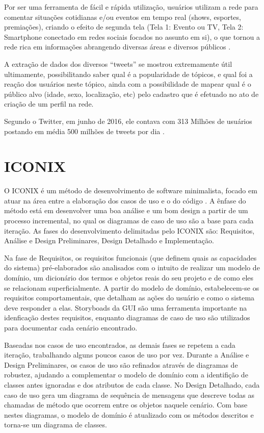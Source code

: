 \documentclass[
	12pt,				%
	openright,			%
	oneside,			%
	a4paper,			%
	english,			%
	spanish,			%
	brazil				%
	]{abntex2}
\begin{document}
	Por ser uma ferramenta de fácil e rápida utilização, usuários utilizam a rede para comentar situações cotidianas e/ou eventos em tempo real (shows, esportes, premiações), criando o efeito de segunda tela (Tela 1: Evento ou TV, Tela 2: Smartphone conectado em redes sociais focados no assunto em si), o que tornou a rede rica em informações abrangendo diversas áreas e diversos públicos \cite{conference_twitter_sports}.

	A extração de dados dos diversos “tweets” se mostrou extremamente útil ultimamente, possibilitando saber qual é a popularidade de tópicos, e qual foi a reação dos usuários neste tópico,  ainda com a possibilidade de mapear qual é o público alvo (idade, sexo, localização, etc) pelo cadastro que é efetuado no ato de criação de um perfil na rede.

	Segundo o Twitter, em junho de 2016, ele contava com 313 Milhões de usuários \cite{twitter_company} postando em média 500 milhões de tweets por dia \cite{TwitterU87:online}.
	
	\section{ICONIX}	
	
	O ICONIX é um método de desenvolvimento de software minimalista, focado em atuar na área entre a elaboração dos casos de uso e o do código \cite{iconix}. A ênfase do método está em desenvolver uma boa análise e um bom design a partir de um processo incremental, no qual os diagramas de caso de uso são a base para cada iteração. As fases do desenvolvimento delimitadas pelo ICONIX são: Requisitos, Análise e Design Preliminares, Design Detalhado e Implementação.
	
	Na fase de Requisitos, os requisitos funcionais (que definem quais as capacidades do sistema) pré-elaborados são analisados com o intuito de realizar um modelo de domínio, um dicionário dos termos e objetos reais do seu projeto e de como eles se relacionam superficialmente. A partir do modelo de domínio, estabelecem-se os requisitos comportamentais, que detalham as ações do usuário e como o sistema deve responder a elas. \cite{iconix} Storyboads da GUI são uma ferramenta importante na idenficação destes requisitos, enquanto diagramas de caso de uso são utilizados para documentar cada cenário encontrado.
	
	Baseadas nos casos de uso encontrados, as demais fases se repetem a cada iteração, trabalhando alguns poucos casos de uso por vez. Durante a Análise e Design Preliminares, os casos de uso são refinados através de diagramas de robustez, ajudando a complementar o modelo de domínio com a identifição de classes antes ignoradas e dos atributos de cada classe. No Design Detalhado, cada caso de uso gera um diagrama de sequência de mensagens que descreve todas as chamadas de método que ocorrem entre os objetos naquele cenário. Com base nestes diagramas, o modelo de domínio é atualizado com os métodos descritos e torna-se um diagrama de classes.
	
\end{document}
